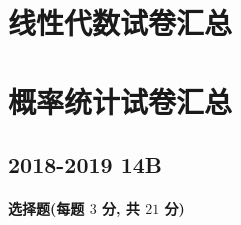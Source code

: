 \documentclass[cn,11pt,fancy,hide]{elegantbook}
\begin{document}
\chapter{线性代数试卷汇总}








\chapter{概率统计试卷汇总}

\section{2018-2019 14B}
\subsubsection{选择题(每题 $3$ 分, 共 $21$ 分)}
\end{document}
